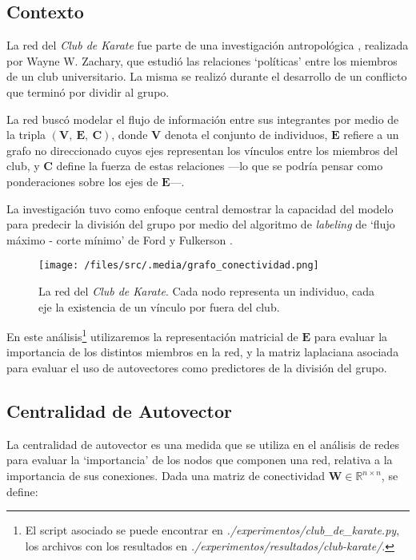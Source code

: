 
\vspace{1em}
\subsection{Contexto}

La red del \textit{Club de Karate} fue parte de una investigación antropológica \cite{Zachary}, realizada por Wayne W. Zachary, que estudió las relaciones `políticas' entre los miembros de un club universitario. La misma se realizó durante el desarrollo de un conflicto que terminó por dividir al grupo. 

La red buscó modelar el flujo de información entre sus integrantes por medio de la tripla $(\mathbf{V},\ \mathbf{E},\ \mathbf{C})$, donde $\mathbf{V}$ denota el conjunto de individuos, $\mathbf{E}$ refiere a un grafo no direccionado cuyos ejes representan los vínculos entre los miembros del club, y $\mathbf{C}$ define la fuerza de estas relaciones ---lo que se podría pensar como ponderaciones sobre los ejes de $\mathbf{E}$---. 

\vspace{1em}
La investigación tuvo como enfoque central demostrar la capacidad del modelo para predecir la división del grupo por medio del algoritmo de \textit{labeling} de `flujo máximo - corte mínimo' de Ford y Fulkerson \cite{Ford}.

\vspace{1em}
\begin{figure}[!htbp]
\texttt{[image: /files/src/.media/grafo\_conectividad.png]}
\caption{La red del \textit{Club de Karate}. Cada nodo representa un individuo, cada eje la existencia de un vínculo por fuera del club.}
\end{figure}


\vspace{1em}
En este análisis\footnote{El script asociado se puede encontrar en \textit{./experimentos/club\_de\_karate.py}, los archivos con los resultados en \textit{./experimentos/resultados/club-karate/}.} utilizaremos la representación matricial de $\mathbf{E}$ para evaluar la importancia de los distintos miembros en la red, y la matriz laplaciana asociada para evaluar el uso de autovectores como predictores de la división del grupo. 

 


\newpage
\vspace{2em}
\subsection{Centralidad de Autovector} La centralidad de autovector es una medida que se utiliza en el análisis de redes para evaluar la `importancia' de los nodos que componen una red, relativa a la importancia de sus conexiones. Dada una matriz de conectividad $\mathbf{W} \in \mathbb{R}^{n \times n}$, se define:


